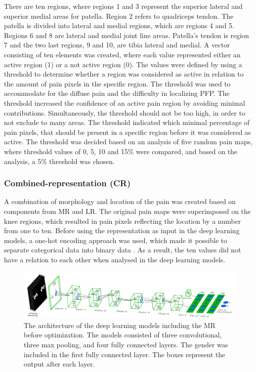 \noindent 
There are ten regions, where regions 1 and 3 represent the superior lateral and superior medial areas for patella. Region 2 refers to quadriceps tendon. The patella is divided into lateral and medial regions, which are regions 4 and 5. Regions 6 and 8 are lateral and medial joint line areas. Patella's tendon is region 7 and the two last regions, 9 and 10, are tibia lateral and medial.\citep{Elson2010} \newline
\noindent
A vector consisting of ten elements was created, where each value represented either an active region (1) or a not active region (0). The values were defined by using a threshold to determine whether a region was considered as active in relation to the amount of pain pixels in the specific region. The threshold was used to accommodate for the diffuse pain and the difficulty in localizing PFP. The threshold increased the confidence of an active pain region by avoiding minimal contributions. Simultaneously, the threshold should not be too high, in order to not exclude to many areas. The threshold indicated which minimal percentage of pain pixels, that should be present in a specific region before it was considered as active. The threshold was decided based on an analysis of five random pain maps, where threshold values of 0, 5, 10 and 15\% were compared, and based on the analysis, a 5\% threshold was chosen.  

\subsubsection{Combined-representation (CR)}
A combination of morphology and location of the pain was created based on components from MR and LR. The original pain maps were superimposed on the knee regions, which resulted in pain pixels reflecting the location by a number from one to ten. Before using the representation as input in the deep learning models, a one-hot encoding approach was used, which made it possible to separate categorical data into binary data \citep{Harris2012}. As a result, the ten values did not have a relation to each other when analysed in the deep learning models. 


\begin{figure} [t!]
\centering
\includegraphics[width=1\textwidth]{Figures/models}
\caption{The architecture of the deep learning models including the MR before optimization. The models consisted of three convolutional, three max pooling, and four fully connected layers. The gender was included in the first fully connected layer. The boxes represent the output after each layer.}
\label{fig:models}
\end{figure}

